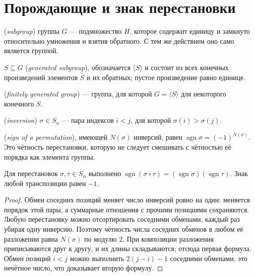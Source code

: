 \section{Порождающие и знак перестановки}
\begin{definition}
 (\emph{subgroup}) группы \(G\) --- подмножество \(H\), которое содержит единицу и замкнуто относительно умножения и взятия обратного. С тем же действием оно само является группой.
\end{definition}
\begin{definition}
 \(S\subseteq G\) (\emph{generated subgroup}), обозначается \(\langle S\rangle\) и состоит из всех конечных произведений элементов \(S\) и их обратных; пустое произведение равно единице. \par{} (\emph{finitely generated group}) --- группа, для которой \(G=\langle S\rangle\) для некоторого конечного \(S\).
\end{definition}
\begin{definition}
 (\emph{inversion}) \(\sigma\in S_n\) --- пара индексов \(i<j\), для которой \(\sigma(i)>\sigma(j)\). \par{} (\emph{sign of a permutation}), имеющей \(N(\sigma)\) инверсий, равен \(\operatorname{sgn}\sigma=(-1)^{N(\sigma)}\). Это чётность перестановки, которую не следует смешивать с чётностью её порядка как элемента группы.
\end{definition}
\begin{theorem}\label{thm:olympiad-permutation-sign}
Для перестановок \(\sigma,\tau\in S_n\) выполнено \(\operatorname{sgn}(\sigma\circ\tau)=(\operatorname{sgn}\sigma)(\operatorname{sgn}\tau)\). Знак любой транспозиции равен \(-1\).
\end{theorem}
\begin{proof}
Обмен соседних позиций меняет число инверсий ровно на один: меняется порядок этой пары, а суммарные отношения с прочими позициями сохраняются. Любую перестановку можно отсортировать соседними обменами, каждый раз убирая одну инверсию. Поэтому чётность числа соседних обменов в любом её разложении равна \(N(\sigma)\) по модулю \(2\). При композиции разложения приписываются друг к другу, и их длины складываются; отсюда первая формула. Обмен позиций \(i<j\) можно выполнить \(2(j-i)-1\) соседними обменами; это нечётное число, что доказывает вторую формулу.
\end{proof}

